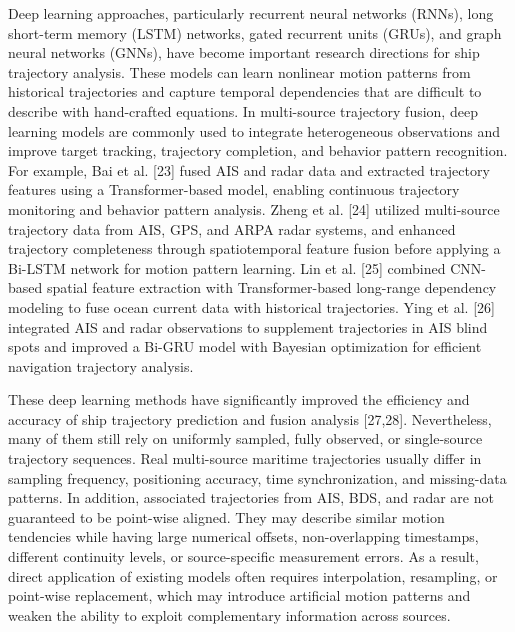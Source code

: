 \documentclass[a4paper,fleqn]{cas-dc}
\begin{document}
Deep learning approaches, particularly recurrent neural networks (RNNs), long short-term memory (LSTM) networks, gated recurrent units (GRUs), and graph neural networks (GNNs), have become important research directions for ship trajectory analysis. These models can learn nonlinear motion patterns from historical trajectories and capture temporal dependencies that are difficult to describe with hand-crafted equations. In multi-source trajectory fusion, deep learning models are commonly used to integrate heterogeneous observations and improve target tracking, trajectory completion, and behavior pattern recognition. For example, Bai et al. [23] fused AIS and radar data and extracted trajectory features using a Transformer-based model, enabling continuous trajectory monitoring and behavior pattern analysis. Zheng et al. [24] utilized multi-source trajectory data from AIS, GPS, and ARPA radar systems, and enhanced trajectory completeness through spatiotemporal feature fusion before applying a Bi-LSTM network for motion pattern learning. Lin et al. [25] combined CNN-based spatial feature extraction with Transformer-based long-range dependency modeling to fuse ocean current data with historical trajectories. Ying et al. [26] integrated AIS and radar observations to supplement trajectories in AIS blind spots and improved a Bi-GRU model with Bayesian optimization for efficient navigation trajectory analysis.

These deep learning methods have significantly improved the efficiency and accuracy of ship trajectory prediction and fusion analysis [27,28]. Nevertheless, many of them still rely on uniformly sampled, fully observed, or single-source trajectory sequences. Real multi-source maritime trajectories usually differ in sampling frequency, positioning accuracy, time synchronization, and missing-data patterns. In addition, associated trajectories from AIS, BDS, and radar are not guaranteed to be point-wise aligned. They may describe similar motion tendencies while having large numerical offsets, non-overlapping timestamps, different continuity levels, or source-specific measurement errors. As a result, direct application of existing models often requires interpolation, resampling, or point-wise replacement, which may introduce artificial motion patterns and weaken the ability to exploit complementary information across sources.
\end{document}

